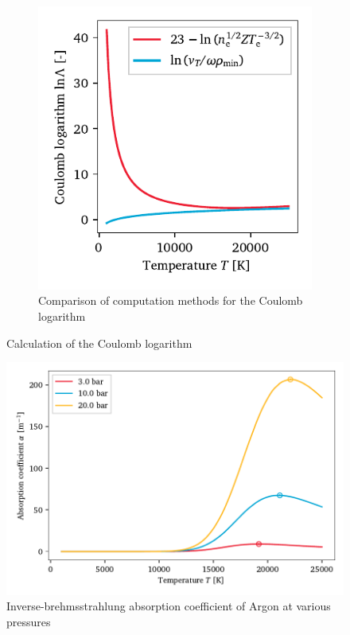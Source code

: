\begin{figure}[h]
\begin{subfigure}[t]{2.9in}
                \includegraphics[]{assets/4 models/coulombLog.pdf}
                \caption{Comparison of computation methods for the Coulomb logarithm}
                \label{fig:coulomb_coulomb}
            \end{subfigure}
            \caption{Calculation of the Coulomb logarithm}
            \label{fig:coulomb}
        \end{figure}

        \begin{figure}[h]
            \centering
            \includegraphics[]{assets/4 models/absorption.pdf}
            \caption{Inverse-brehmsstrahlung absorption coefficient of Argon at various pressures}
            \label{fig:ib_coeff}
        \end{figure}
